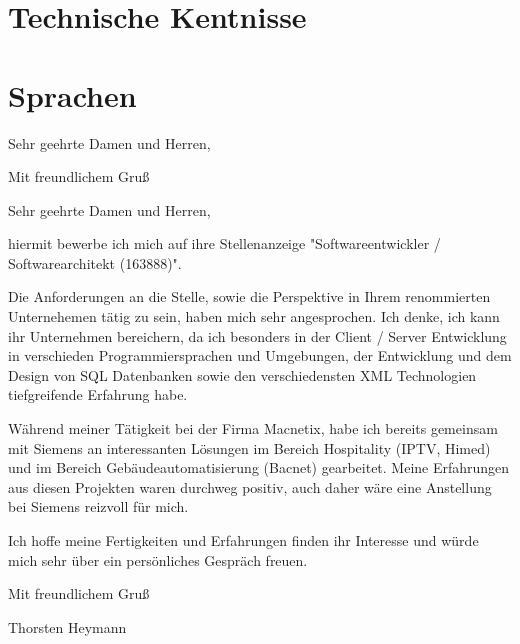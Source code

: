 \documentclass[12pt,a4paper,sans]{moderncv}
\begin{document}
	\section{Technische Kentnisse}
	

	\section{Sprachen}


	\clearpage

	\date{Dienstag, 17. Juni 2014}
	\opening{Sehr geehrte Damen und Herren,}
	\closing{Mit freundlichem Gruß}
	\makelettertitle
Sehr geehrte Damen und Herren,

hiermit bewerbe ich mich auf ihre Stellenanzeige "Softwareentwickler / Softwarearchitekt (163888)".

Die Anforderungen an die Stelle, sowie die Perspektive in Ihrem renommierten Unternehemen tätig zu sein, haben mich sehr angesprochen. Ich denke, ich kann ihr Unternehmen bereichern, da ich besonders in der Client / Server Entwicklung in verschieden Programmiersprachen und Umgebungen, der Entwicklung und dem Design von SQL Datenbanken sowie den verschiedensten XML Technologien tiefgreifende Erfahrung habe.

Während meiner Tätigkeit bei der Firma Macnetix, habe ich bereits gemeinsam mit Siemens an interessanten Lösungen im Bereich Hospitality (IPTV, Himed) und im Bereich Gebäudeautomatisierung (Bacnet) gearbeitet. Meine Erfahrungen aus diesen Projekten  waren durchweg positiv, auch daher wäre eine Anstellung bei Siemens reizvoll für mich.

Ich hoffe meine Fertigkeiten und Erfahrungen finden ihr Interesse und würde mich sehr über ein persönliches Gespräch freuen.

\vspace{5pt}
Mit freundlichem Gruß

Thorsten Heymann
\end{document}
